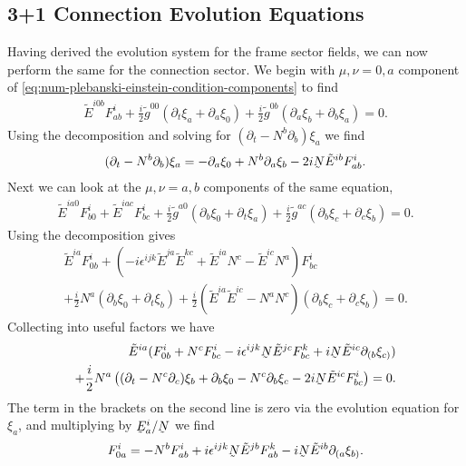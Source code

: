 \documentclass[10pt]{report}
\newcommand{\utilde}[1]{\underaccent{\tilde}{#1}}
\theoremstyle{definition}
\newcommand{\tE}[0]{\tilde{E}}
\newcommand{\tg}[0]{\tilde{g}}
\newcommand{\dlap}[0]{\utilde{N}}
\newcommand{\utE}[0]{\utilde{E}}
\begin{document}
    \subsection{3+1 Connection Evolution Equations}
    Having derived the evolution system for the frame sector fields, we can now perform the same for the connection sector. We begin with $\mu,\nu = 0,a$ component of \cref{eq:num-plebanski-einstein-condition-components} to find 
    \begin{align}
     \tE^{i0b} F^i_{ab} + \frac{i}{2} \tg^{00} \left(\partial_t \xi_a + \partial_a \xi_0\right) + \frac{i}{2} \tg^{0b} \left(\partial_a \xi_b + \partial_b \xi_a\right) = 0.
    \end{align}
    Using the decomposition and solving for $(\partial_t - N^b \partial_b) \xi_a$ we find 
    \begin{align}
        (\partial_t - N^b \partial_b) \xi_a = -\partial_a \xi_0 + N^b \partial_a \xi_b - 2i \dlap \tE^{ib} F^i_{ab}.
    \end{align}
    Next we can look at the $\mu,\nu = a,b$ components of the same equation,
    \begin{align}
     \tE^{ia0} F^i_{b0} + \tE^{iac} F^i_{bc} + \frac{i}{2} \tg^{a0} \left(\partial_b \xi_0 + \partial_t \xi_a \right) + \frac{i}{2} \tg^{ac} \left(\partial_b \xi_c + \partial_c \xi_b\right) = 0.
    \end{align}
    Using the decomposition gives 
    \begin{align}
        \tE^{ia} F^i_{0b} + \left(-i \epsilon^{ijk} \tE^{ja} \tE^{kc} + \tE^{ia} N^c - \tE^{ic} N^a\right) F^i_{bc} \nonumber \\ + \frac{i}{2} N^a (\partial_b \xi_0 + \partial_t \xi_b) + \frac{i}{2}(\tE^{ia} \tE^{ic} - N^a N^c)(\partial_b \xi_c + \partial_c \xi_b) = 0.
    \end{align}
    Collecting into useful factors we have
    \begin{align}
        \tE^{ia}( F^i_{0b} + N^c F^i_{bc} - i \epsilon^{ijk} \dlap \tE^{jc} F^k_{bc} + i \dlap \tE^{ic} \partial_{(b} \xi_{c)}) \nonumber \\ + \frac{i}{2} N^a \left( (\partial_t - N^c \partial_c) \xi_b + \partial_b \xi_0 - N^c \partial_b \xi_c - 2i \dlap \tE^{ic} F^i_{bc} \right) = 0.
    \end{align}
    The term in the brackets on the second line is zero via the evolution equation for $\xi_a$, and multiplying by $\utE^i_a/\dlap$ we find 
    \begin{align}
        F^i_{0a} = - N^b F^i_{ab} + i\epsilon^{ijk} \dlap \tE^{jb} F^k_{ab} - i \dlap \tE^{ib} \partial_{(a} \xi_{b)}.
    \end{align}
\end{document}
